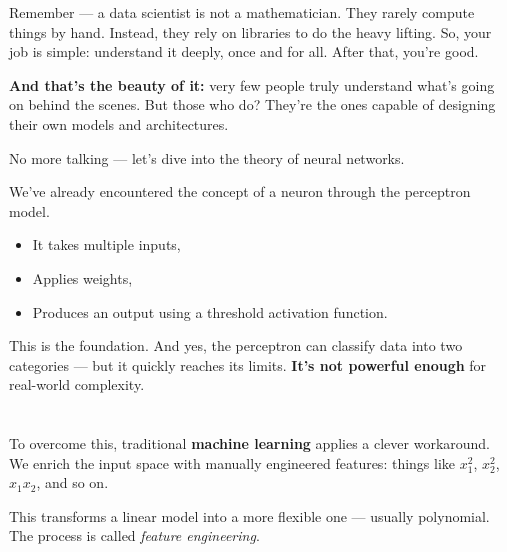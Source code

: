 \documentclass[11pt]{article}
\begin{document}
\vspace{1em}

Remember — a data scientist is not a mathematician.  
They rarely compute things by hand. Instead, they rely on libraries to do the heavy lifting.  
So, your job is simple: understand it deeply, once and for all. After that, you're good.

\vspace{0.5em}

\textbf{And that’s the beauty of it:} very few people truly understand what's going on behind the scenes.  
But those who do? They're the ones capable of designing their own models and architectures.

\vspace{1em}

\begin{tcolorbox}[colback=blue!5, colframe=blue!80!black, title=Let’s begin]
No more talking — let’s dive into the theory of neural networks.
\end{tcolorbox}

\vspace{2em}

We’ve already encountered the concept of a neuron through the perceptron model.

\begin{itemize}
  \item It takes multiple inputs,
  \item Applies weights,
  \item Produces an output using a threshold activation function.
\end{itemize}

This is the foundation.  
And yes, the perceptron can classify data into two categories — but it quickly reaches its limits.  
\textbf{It’s not powerful enough} for real-world complexity.

\vspace{2em}

\section*{}

To overcome this, traditional \textbf{machine learning} applies a clever workaround.  
We enrich the input space with manually engineered features: things like $x_1^2$, $x_2^2$, $x_1x_2$, and so on.

This transforms a linear model into a more flexible one — usually polynomial.  
The process is called \textit{feature engineering}.
\end{document}
